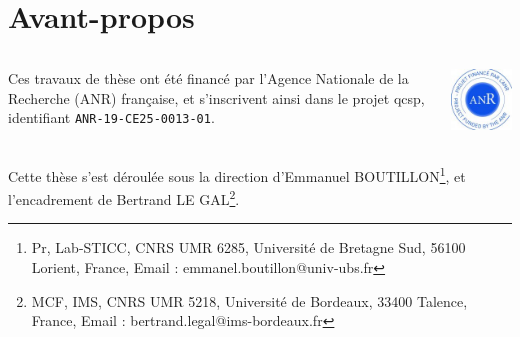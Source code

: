 \documentclass[hidelinks, french, xcolor={table, rgb, dvipsnames, x11names}, aspectratio=169, professionalfonts]{beamer}
\begin{document}
\section*{Avant-propos} %
\begin{frame}{\secname}
  \begin{center}
    \begin{columns}
      \begin{column}{.6\linewidth}
        Ces travaux de thèse ont été financé par l'Agence Nationale de la Recherche (ANR) française, et s'inscrivent ainsi dans le projet \acrfull{qcsp}, identifiant \texttt{ANR-19-CE25-0013-01}.
      \end{column}
      \begin{column}{.2\linewidth}
        \hfill \includegraphics[width=\linewidth]{anr_approved.jpg}
      \end{column}
    \end{columns}

    \vspace{3 em}

    Cette thèse s'est déroulée sous la direction d'Emmanuel BOUTILLON\footnote{\tiny Pr, Lab-STICC, CNRS UMR 6285, Université de Bretagne Sud, 56100 Lorient, France, Email : emmanel.boutillon@univ-ubs.fr}, et l'encadrement de Bertrand LE GAL\footnote{\tiny MCF, IMS, CNRS UMR 5218, Université de Bordeaux, 33400 Talence, France, Email : bertrand.legal@ims-bordeaux.fr \vspace{1em}}.
  \end{center}
\end{frame}
\end{document}
